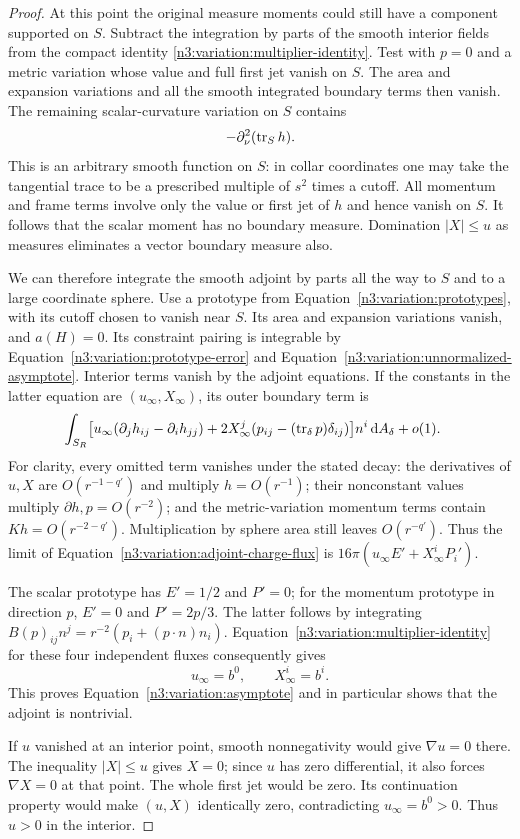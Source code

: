 \begin{proof}
At this point the original measure moments could still have a
component supported on $S$.  Subtract the integration by parts of
the smooth interior fields from the compact identity
\eqref{n3:variation:multiplier-identity}.  Test with $p=0$ and a metric
variation whose value and full first jet vanish on $S$.  The area
and expansion variations and all the smooth integrated boundary
terms then vanish.  The remaining scalar-curvature variation on
$S$ contains
\[
 -\partial_\nu^2(\operatorname{tr}_S h).
\]
This is an arbitrary smooth function on $S$: in collar coordinates
one may take the tangential trace to be a prescribed multiple of
$s^2$ times a cutoff.  All momentum and frame terms involve only
the value or first jet of $h$ and hence vanish on $S$.  It follows
that the scalar moment has no boundary measure.  Domination
$|X|\le u$ as measures eliminates a vector boundary measure also.

We can therefore integrate the smooth adjoint by parts all the way
to $S$ and to a large coordinate sphere.  Use a prototype from
Equation~\eqref{n3:variation:prototypes}, with its cutoff chosen to
vanish near $S$.  Its area and expansion variations vanish, and
$a(H)=0$.  Its constraint pairing is integrable by
Equation~\eqref{n3:variation:prototype-error} and
Equation~\eqref{n3:variation:unnormalized-asymptote}.  Interior terms
vanish by the adjoint equations.  If the constants in the latter
equation are $(u_\infty,X_\infty)$, its outer boundary term is
\begin{equation}
 \begin{split}
 \int_{S_R}\bigl[&u_\infty(\partial_jh_{ij}-\partial_i h_{jj})
       +2X_\infty^j(p_{ij}-(\operatorname{tr}_\delta p)\delta_{ij})\bigr]
          n^i\,\mathrm d A_\delta+o(1).
 \end{split}
 \label{n3:variation:adjoint-charge-flux}
\end{equation}
For clarity, every omitted term vanishes under the stated decay:
the derivatives of $u,X$ are $O(r^{-1-q'})$ and multiply
$h=O(r^{-1})$; their nonconstant values multiply
$\partial h,p=O(r^{-2})$; and the metric-variation momentum terms
contain $Kh=O(r^{-2-q'})$.  Multiplication by sphere area still
leaves $O(r^{-q'})$.  Thus the limit of
Equation~\eqref{n3:variation:adjoint-charge-flux} is
$16\pi(u_\infty E'+X_\infty^iP_i')$.

The scalar prototype has $E'=1/2$ and $P'=0$; for the momentum
prototype in direction $p$, $E'=0$ and $P'=2p/3$.  The latter follows
by integrating
$B(p)_{ij}n^j=r^{-2}(p_i+(p\cdot n)n_i)$.
Equation~\eqref{n3:variation:multiplier-identity} for these four
independent fluxes consequently gives
\[
 u_\infty=b^0,\qquad X_\infty^i=b^i.
\]
This proves Equation~\eqref{n3:variation:asymptote} and in particular
shows that the adjoint is nontrivial.

If $u$ vanished at an interior point, smooth nonnegativity would
give $\nabla u=0$ there.  The inequality $|X|\le u$ gives $X=0$;
since $u$ has zero differential, it also forces $\nabla X=0$ at
that point.  The whole first jet would be zero.  Its continuation
property would make $(u,X)$ identically zero, contradicting
$u_\infty=b^0>0$.  Thus $u>0$ in the interior.
\end{proof}

